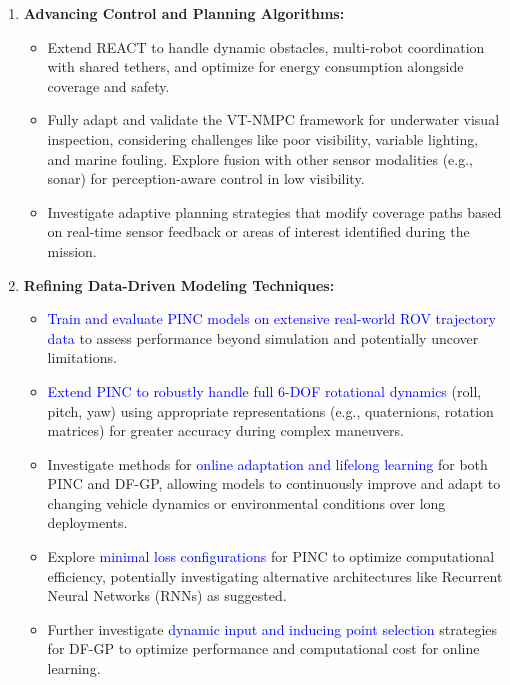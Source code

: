\begin{enumerate}
    \item \textbf{Advancing Control and Planning Algorithms:}
        \begin{itemize}
            \item Extend REACT to handle dynamic obstacles, multi-robot coordination with shared tethers, and optimize for energy consumption alongside coverage and safety.
            \item Fully adapt and validate the VT-NMPC framework for underwater visual inspection, considering challenges like poor visibility, variable lighting, and marine fouling. Explore fusion with other sensor modalities (e.g., sonar) for perception-aware control in low visibility.
            \item Investigate adaptive planning strategies that modify coverage paths based on real-time sensor feedback or areas of interest identified during the mission.
        \end{itemize}

    \item \textbf{Refining Data-Driven Modeling Techniques:}
        \begin{itemize}
            \item \textcolor{blue}{Train and evaluate PINC models on extensive real-world ROV trajectory data} to assess performance beyond simulation and potentially uncover limitations.
            \item \textcolor{blue}{Extend PINC to robustly handle full 6-DOF rotational dynamics} (roll, pitch, yaw) using appropriate representations (e.g., quaternions, rotation matrices) for greater accuracy during complex maneuvers.
            \item Investigate methods for \textcolor{blue}{online adaptation and lifelong learning} for both PINC and DF-GP, allowing models to continuously improve and adapt to changing vehicle dynamics or environmental conditions over long deployments.
            \item Explore \textcolor{blue}{minimal loss configurations} for PINC to optimize computational efficiency, potentially investigating alternative architectures like Recurrent Neural Networks (RNNs) as suggested.
            \item Further investigate \textcolor{blue}{dynamic input and inducing point selection} strategies for \ac{DF-GP} to optimize performance and computational cost for online learning.
        \end{itemize}


\end{enumerate}